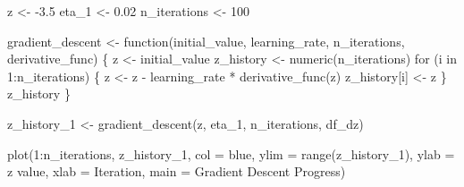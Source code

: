 \documentclass[
  letterpaper,
  DIV=11,
  numbers=noendperiod]{scrartcl}
\newenvironment{Shaded}{\begin{snugshade}}{\end{snugshade}}
\newcommand{\AttributeTok}[1]{\textcolor[rgb]{0.40,0.45,0.13}{#1}}
\newcommand{\ControlFlowTok}[1]{\textcolor[rgb]{0.00,0.23,0.31}{#1}}
\newcommand{\DecValTok}[1]{\textcolor[rgb]{0.68,0.00,0.00}{#1}}
\newcommand{\FloatTok}[1]{\textcolor[rgb]{0.68,0.00,0.00}{#1}}
\newcommand{\FunctionTok}[1]{\textcolor[rgb]{0.28,0.35,0.67}{#1}}
\newcommand{\NormalTok}[1]{\textcolor[rgb]{0.00,0.23,0.31}{#1}}
\newcommand{\OtherTok}[1]{\textcolor[rgb]{0.00,0.23,0.31}{#1}}
\newcommand{\SpecialCharTok}[1]{\textcolor[rgb]{0.37,0.37,0.37}{#1}}
\newcommand{\StringTok}[1]{\textcolor[rgb]{0.13,0.47,0.30}{#1}}
\begin{document}
\begin{Shaded}
\begin{Highlighting}[]
\NormalTok{z }\OtherTok{\textless{}{-}} \SpecialCharTok{{-}}\FloatTok{3.5}
\NormalTok{eta\_1 }\OtherTok{\textless{}{-}} \FloatTok{0.02}
\NormalTok{n\_iterations }\OtherTok{\textless{}{-}} \DecValTok{100}

\NormalTok{gradient\_descent }\OtherTok{\textless{}{-}} \ControlFlowTok{function}\NormalTok{(initial\_value, learning\_rate, n\_iterations, derivative\_func) \{}
\NormalTok{  z }\OtherTok{\textless{}{-}}\NormalTok{ initial\_value}
\NormalTok{  z\_history }\OtherTok{\textless{}{-}} \FunctionTok{numeric}\NormalTok{(n\_iterations)}
  \ControlFlowTok{for}\NormalTok{ (i }\ControlFlowTok{in} \DecValTok{1}\SpecialCharTok{:}\NormalTok{n\_iterations) \{}
\NormalTok{    z }\OtherTok{\textless{}{-}}\NormalTok{ z }\SpecialCharTok{{-}}\NormalTok{ learning\_rate }\SpecialCharTok{*} \FunctionTok{derivative\_func}\NormalTok{(z)}
\NormalTok{    z\_history[i] }\OtherTok{\textless{}{-}}\NormalTok{ z}
\NormalTok{  \}}
\NormalTok{  z\_history}
\NormalTok{\}}

\NormalTok{z\_history\_1 }\OtherTok{\textless{}{-}} \FunctionTok{gradient\_descent}\NormalTok{(z, eta\_1, n\_iterations, df\_dz)}
\end{Highlighting}
\end{Shaded}

\begin{Shaded}
\begin{Highlighting}[]
\FunctionTok{plot}\NormalTok{(}\DecValTok{1}\SpecialCharTok{:}\NormalTok{n\_iterations, z\_history\_1,  }\AttributeTok{col =} \StringTok{\textquotesingle{}blue\textquotesingle{}}\NormalTok{, }\AttributeTok{ylim =} \FunctionTok{range}\NormalTok{(z\_history\_1), }\AttributeTok{ylab =} \StringTok{\textquotesingle{}z value\textquotesingle{}}\NormalTok{, }\AttributeTok{xlab =} \StringTok{\textquotesingle{}Iteration\textquotesingle{}}\NormalTok{, }\AttributeTok{main =} \StringTok{\textquotesingle{}Gradient Descent Progress\textquotesingle{}}\NormalTok{)}
\end{Highlighting}
\end{Shaded}
\end{document}
